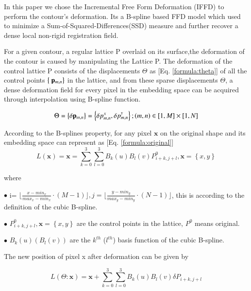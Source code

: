 \documentclass[3p,times]{elsarticle}
\begin{document}
In this paper we chose the Incremental Free Form Deformation
(IFFD)\cite{huang_shape_2006} to perform the contour's
deformation. Its a B-spline based FFD model which used to minimize a
Sum-of-Squared-Differences(SSD) measure and further recover a dense
local non-rigid registration field.

For a given contour, a regular lattice P overlaid on its surface,the
deformation of the contour is caused by manipulating the Lattice P. The
deformation of the control lattice P consists of the
displacements $\Theta$ as [Eq. \ref{formula:theta}] of
all the control points $\left\{ \mbox{ $\mathbf{p}_{\boldmath{m,n}}$} \right\}$ in the lattice, and from these sparse
displacements $\Theta$, a dense deformation field for every pixel in the
embedding space can be acquired through interpolation using B-spline
function.

\begin{equation}
\label{formula:theta}
\Theta=\left\{\delta \mathbf{p}_{\boldmath{m,n}}\right\}=
\left\{
    \delta p ^{\boldmath{x}}_{\boldmath{m,n}},\delta p^{\boldmath{y}}_{\boldmath{m,n}}
\right\}
;(m,n)\in[1,M] \times [1,N]
\end{equation}

According to the B-splines property, for any pixel $\mathbf{x}$ on the original
shape and its embedding space can represent as [Eq. \ref{formula:original}]
\begin{equation}  
\label{formula:original}
L(\mathbf{x})=\mathbf{x}= \sum\limits_{k=0}^{3}\sum\limits_{l=0}^{3}B_k(u)B_l(v)P^0_{i+k,j+l},\mathbf{x}=\left\{x,y \right\}
\end{equation}

where 

$\bullet$
i=
$\lfloor \frac{x-min_x}{max_x-min_x} \cdot(M-1)\rfloor,
j=\lfloor \frac{y-min_y}{max_y-min_y} \cdot(N-1)  \rfloor$,
this is according to the definition of the cubic B-spline.

$\bullet$
$P^0_{i+k,j+l},\mathbf{x}=\left\{x,y \right\}$ are the control points
in the lattice, $P^0$ means original.

$\bullet$
$B_k(u)(B_l(v))$ are  the $k^{th}$ ($l^{th}$) basis function of the
cubic B-spline.

The new position of pixel x after deformation can be given by

\begin{equation}
\label{formula:deformation}
L(\Theta:\mathbf{x})=\mathbf{x}+\sum\limits_{k=0}^{3}\sum\limits_{l=0}^{3}B_k(u)B_l(v)
\delta P_{i+k,j+l}
\end{equation}
\end{document}
